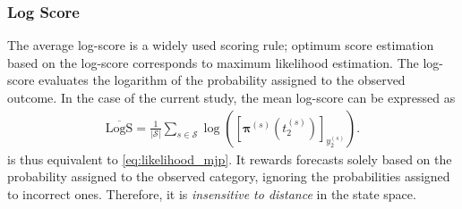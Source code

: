 \subsubsection{Log Score}
The average log-score is a widely used scoring rule; optimum score estimation based on the log-score corresponds to maximum likelihood estimation. The log-score evaluates the logarithm of the probability assigned to the observed outcome. In the case of the current study, the mean log-score can be expressed as
\begin{align}
    \overline{\text{LogS}} = \frac{1}{\vert \mathcal{S} \vert} \sum_{s \in \mathcal{S}} \log \left( \left[ \bm{\pi}^{(s)}\left( t_2^{(s)} \right)  \right]_{ y_2^{(s)}} \right).  \label{eq:log_Score}
\end{align}
 is thus equivalent to \cref{eq:likelihood_mjp}.
It rewards forecasts solely based on the probability assigned to the observed category, ignoring the probabilities assigned to incorrect ones. Therefore, it is \textit{insensitive to distance} in the state space.  

%


